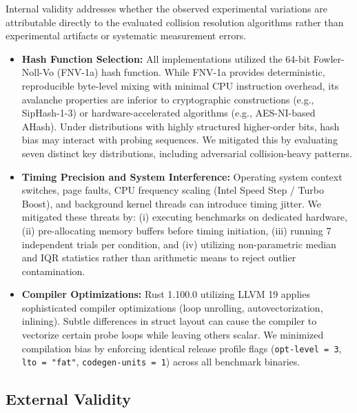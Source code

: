 \documentclass[conference]{IEEEtran}
\begin{document}
Internal validity addresses whether the observed experimental variations are attributable directly to the evaluated collision resolution algorithms rather than experimental artifacts or systematic measurement errors.
\begin{itemize}
  \item \textbf{Hash Function Selection:} All implementations utilized the 64-bit Fowler-Noll-Vo (FNV-1a) hash function. While FNV-1a provides deterministic, reproducible byte-level mixing with minimal CPU instruction overhead, its avalanche properties are inferior to cryptographic constructions (e.g., SipHash-1-3) or hardware-accelerated algorithms (e.g., AES-NI-based AHash). Under distributions with highly structured higher-order bits, hash bias may interact with probing sequences. We mitigated this by evaluating seven distinct key distributions, including adversarial collision-heavy patterns.
  \item \textbf{Timing Precision and System Interference:} Operating system context switches, page faults, CPU frequency scaling (Intel Speed Step / Turbo Boost), and background kernel threads can introduce timing jitter. We mitigated these threats by: (i) executing benchmarks on dedicated hardware, (ii) pre-allocating memory buffers before timing initiation, (iii) running 7 independent trials per condition, and (iv) utilizing non-parametric median and IQR statistics rather than arithmetic means to reject outlier contamination.
  \item \textbf{Compiler Optimizations:} Rust 1.100.0 utilizing LLVM 19 applies sophisticated compiler optimizations (loop unrolling, autovectorization, inlining). Subtle differences in struct layout can cause the compiler to vectorize certain probe loops while leaving others scalar. We minimized compilation bias by enforcing identical release profile flags (\texttt{opt-level = 3}, \texttt{lto = "fat"}, \texttt{codegen-units = 1}) across all benchmark binaries.
\end{itemize}

\subsection{External Validity}
\end{document}
